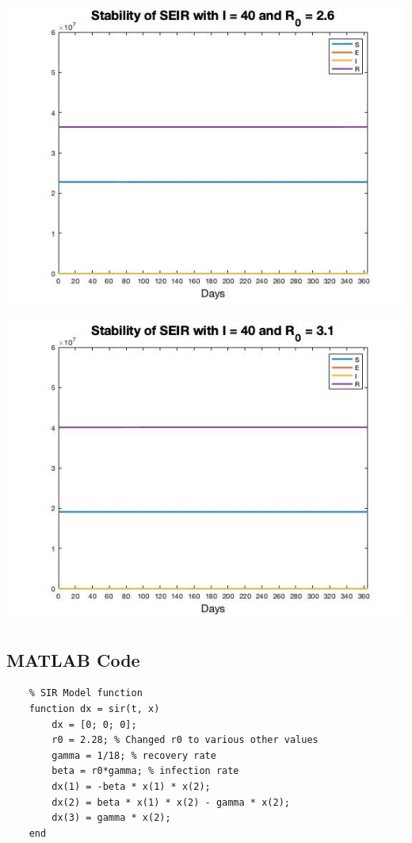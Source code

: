 \documentclass[12pt, a4paper]{article}
\begin{document}
    \includegraphics[scale=0.75]{plots/i40r26_st.jpg}
    
    \includegraphics[scale=0.75]{plots/i40r31_st.jpg}
    
    \newpage
    \subsection{MATLAB Code}
    
    \begin{lstlisting}
    % SIR Model function
    function dx = sir(t, x)
        dx = [0; 0; 0];
        r0 = 2.28; % Changed r0 to various other values
        gamma = 1/18; % recovery rate
        beta = r0*gamma; % infection rate
        dx(1) = -beta * x(1) * x(2);
        dx(2) = beta * x(1) * x(2) - gamma * x(2);
        dx(3) = gamma * x(2);
    end
    \end{lstlisting}
    
\end{document}
